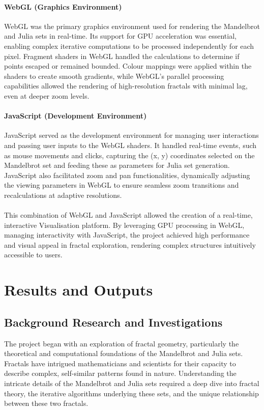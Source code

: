 \documentclass[12pt,a4paper]{report}
\begin{document}
\paragraph{WebGL (Graphics Environment)}
WebGL was the primary graphics environment used for rendering the Mandelbrot and Julia sets in real-time. Its support for GPU acceleration was essential, enabling complex iterative computations to be processed independently for each pixel. Fragment shaders in WebGL handled the calculations to determine if points escaped or remained bounded. Colour mappings were applied within the shaders to create smooth gradients, while WebGL’s parallel processing capabilities allowed the rendering of high-resolution fractals with minimal lag, even at deeper zoom levels. 

\paragraph{JavaScript (Development Environment)}
JavaScript served as the development environment for managing user interactions and passing user inputs to the WebGL shaders. It handled real-time events, such as mouse movements and clicks, capturing the (x, y) coordinates selected on the Mandelbrot set and feeding these as parameters for Julia set generation. JavaScript also facilitated zoom and pan functionalities, dynamically adjusting the viewing parameters in WebGL to ensure seamless zoom transitions and recalculations at adaptive resolutions. 
\\\\
This combination of WebGL and JavaScript allowed the creation of a real-time, interactive Visualisation platform. By leveraging GPU processing in WebGL, managing interactivity with JavaScript, the project achieved high performance and visual appeal in fractal exploration, rendering complex structures intuitively accessible to users. 

\section{Results and Outputs}
\subsection{Background Research and Investigations}
The project began with an exploration of fractal geometry, particularly the theoretical and computational foundations of the Mandelbrot and Julia sets. Fractals have intrigued mathematicians and scientists for their capacity to describe complex, self-similar patterns found in nature. Understanding the intricate details of the Mandelbrot and Julia sets required a deep dive into fractal theory, the iterative algorithms underlying these sets, and the unique relationship between these two fractals. 
\end{document}
